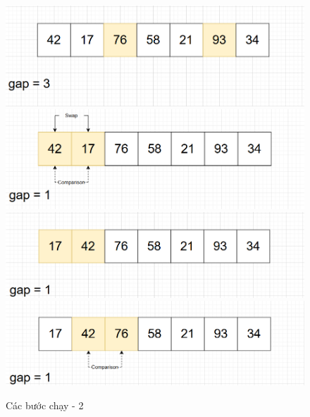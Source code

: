 \begin{figure}[H]
    \centering
    \includegraphics[width=1\linewidth]{img/shell_sort/5.png}
    \vspace{0.5cm}
    \includegraphics[width=1\linewidth]{img/shell_sort/6.png}
    \vspace{0.15cm}
    \includegraphics[width=1\linewidth]{img/shell_sort/7.png}
    \vspace{0.15cm}
    \includegraphics[width=1\linewidth]{img/shell_sort/8.png}
    \caption{Các bước chạy - 2}
    \label{fig:part2}
\end{figure}

